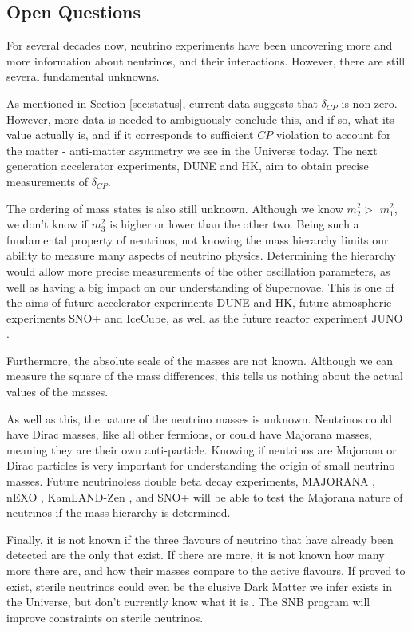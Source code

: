 \subsection{Open Questions}

For several decades now, neutrino experiments have been uncovering more and more information about neutrinos, and their interactions. However, there are still several fundamental unknowns. 

As mentioned in Section \ref{sec:status}, current data suggests that $\delta_{CP}$ is non-zero. However, more data is needed to ambiguously conclude this, and if so, what its value actually is, and if it corresponds to sufficient $CP$ violation to account for the matter - anti-matter asymmetry we see in the Universe today. The next generation accelerator experiments, DUNE and HK, aim to obtain precise measurements of $\delta_{CP}$.

The ordering of mass states is also still unknown. Although we know $m_{2}^2 >$ $m_{1}^2$, we don't know if $m_3^2$ is higher or lower than the other two. Being such a fundamental property of neutrinos, not knowing the mass hierarchy limits our ability to measure many aspects of neutrino physics. Determining the hierarchy would allow more precise measurements of the other oscillation parameters, as well as having a big impact on our understanding of Supernovae. This is one of the aims of future accelerator experiments DUNE and HK, future atmospheric experiments SNO+ and IceCube, as well as the future reactor experiment JUNO \cite{juno}.

Furthermore, the absolute scale of the masses are not known. Although we can measure the square of the mass differences, this tells us nothing about the actual values of the masses.

As well as this, the nature of the neutrino masses is unknown. Neutrinos could have Dirac masses, like all other fermions, or could have Majorana masses, meaning they are their own anti-particle. Knowing if neutrinos are Majorana or Dirac particles is very important for understanding the origin of small neutrino masses. Future neutrinoless double beta decay experiments, MAJORANA \cite{2011majorana}, nEXO \cite{nexo}, KamLAND-Zen \cite{kamlandzen}, and SNO+ will be able to test the Majorana nature of neutrinos if the mass hierarchy is determined.

Finally, it is not known if the three flavours of neutrino that have already been detected are the only that exist. If there are more, it is not known how many more there are, and how their masses compare to the active flavours. If proved to exist, sterile neutrinos could even be the elusive Dark Matter we infer exists in the Universe, but don't currently know what it is \cite{darkmatter}. The SNB program will improve constraints on sterile neutrinos.

